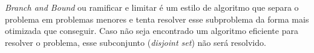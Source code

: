\emph{Branch and Bound} ou ramificar e limitar é um estilo de algoritmo
que separa o problema em problemas menores e tenta resolver esse 
subproblema da forma mais otimizada que conseguir. Caso não
seja encontrado um algoritmo eficiente para resolver o problema, 
esse subconjunto (\emph{disjoint set}) não será resolvido.
